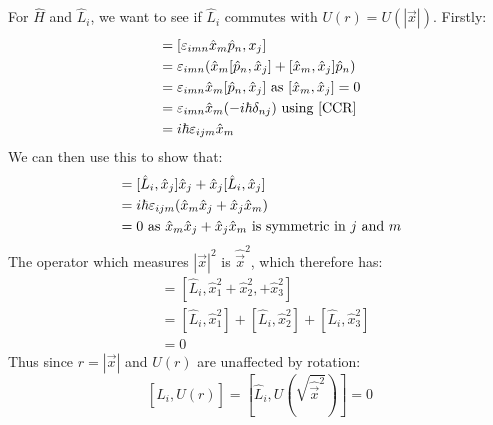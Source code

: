 \documentclass[../main.tex]{subfiles}
\begin{document}
For $\hat{H}$ and $\hat{L}_i$, we want to see if $\hat{L}_i$ commutes with $U(r) = U(|\vec{x}|)$.
Firstly:
\begin{align*}
  [\hat{L}_i, \hat{x}_j] &= [\levi_{i m n} \hat{x}_m \hat{p}_n, x_j] \\
                         &= \levi_{i m n} (\hat{x}_m [\hat{p}_n, \hat{x}_j] + [\hat{x}_m, \hat{x}_j]\hat{p}_n) \\
                         &= \levi_{i m n} \hat{x}_m [\hat{p}_n, \hat{x}_j] \text{ as $[\hat{x}_m, \hat{x}_j] = 0$} \\
                         &= \levi_{i m n} \hat{x}_m (-i\hbar \delta_{n j}) \text{ using \cref{CCR}} \\
                         &= i\hbar \levi_{i j m} \hat{x}_m
\end{align*}
We can then use this to show that:
\begin{align*}
  [\hat{L}_i, \hat{x}^2_j] &= [\hat{L}_i, \hat{x}_j]\hat{x}_j + \hat{x}_j[\hat{L}_i, \hat{x}_j] \\
                           &= i\hbar \levi_{i j m} (\hat{x}_m \hat{x}_j + \hat{x}_j \hat{x}_m) \\
                           &= 0 \text{ as $\hat{x}_m \hat{x}_j + \hat{x}_j \hat{x}_m$ is symmetric in $j$ and $m$}
\end{align*}
The operator which measures $|\vec{x}|^2$ is $\hat{\vec{x}}^2$, which therefore has:
\begin{align*}
  [\hat{L}_i, \hat{\vec{x}}^2] &= [\hat{L}_i, \hat{x}^2_1 + \hat{x}^2_2, + \hat{x}^2_3]  \\
                               &= [\hat{L}_i, \hat{x}^2_1] + [\hat{L}_i, \hat{x}^2_2] + [\hat{L}_i, \hat{x}^2_3] \\
                               &= 0
\end{align*}
Thus since $r = |\vec{x}|$ and $U(r)$ are unaffected by rotation:
\[
  [\hat{L}_i, U(r)] = \left[\hat{L}_i, U\left(\sqrt{\hat{\vec{x}}^2}\right)\right] = 0
\]
\end{document}
